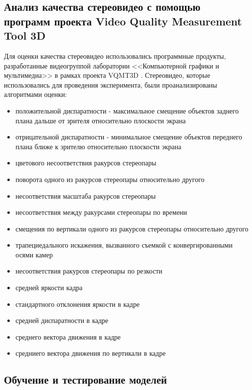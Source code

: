 \subsection{Анализ качества стереовидео с помощью программ проекта Video Quality Measurement Tool 3D}
Для оценки качества стереовидео использовались программные продукты, разработанные видеогруппой лаборатории <<Компьютерной графики и мультимедиа>> в рамках проекта VQMT3D \cite{vqmt3d}. Стереовидео, которые использовались для проведения эксперимента, были проанализированы алгоритмами оценки:
\begin{itemize}
	\item{положительной диспаратности - максимальное смещение объектов заднего плана дальше от зрителя относительно плоскости экрана}
	\item{отрицательной диспаратности - минимальное смещение объектов переднего плана ближе к зрителю относительно плоскости экрана}
	\item{цветового несоответствия ракурсов стереопары}
	\item{поворота одного из ракурсов стереопары относительно другого}
	\item{несоответствия масштаба ракурсов стереопары}
	\item{несоответствия между ракурсами стереопары по времени}
	\item{смещения по вертикали одного из ракурсов стереопары относительно другого}
	\item{трапециедального искажения, вызванного съемкой с конвергированными осями камер}
	\item{несоответствия ракурсов стереопары по резкости}
	\item{средней яркости кадра}
	\item{стандартного отклонения яркости в кадре}
	\item{средней диспаратности в кадре}
	\item{среднего вектора движения в кадре}
	\item{средниего вектора движения по вертикали в кадре}
\end{itemize}

\subsection{Обучение и тестирование моделей}
